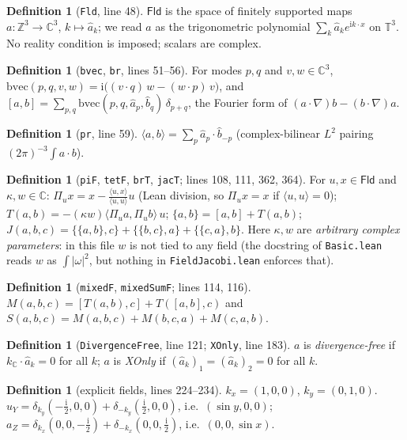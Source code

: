 \documentclass[11pt]{article}\emergencystretch=2em
\theoremstyle{definition}\newtheorem{definition}[theorem]{Definition}\theoremstyle{remark}\newtheorem{remark}[theorem]{Remark}
\newcommand{\Fld}{\mathsf{Fld}}\newcommand{\br}[2]{[#1,#2]}\newcommand{\pr}[2]{\langle #1,#2\rangle}
\newcommand{\ii}{\mathrm{i}}
\begin{document}
\begin{definition}[\texttt{Fld}, line 48]
$\Fld$ is the space of finitely supported maps $a:\mathbb Z^3\to\mathbb C^3$, $k\mapsto \hat a_k$; we read $a$ as the trigonometric polynomial $\sum_k \hat a_k e^{\ii k\cdot x}$ on $\mathbb T^3$. No reality condition is imposed; scalars are complex.
\end{definition}
\begin{definition}[\texttt{bvec}, \texttt{br}, lines 51--56]
For modes $p,q$ and $v,w\in\mathbb C^3$, $\mathrm{bvec}(p,q,v,w)=\ii\big((v\cdot q)\,w-(w\cdot p)\,v\big)$, and
$\br ab=\sum_{p,q}\mathrm{bvec}(p,q,\hat a_p,\hat b_q)\,\delta_{p+q}$, the Fourier form of $(a\cdot\nabla)b-(b\cdot\nabla)a$.
\end{definition}
\begin{definition}[\texttt{pr}, line 59]
$\pr ab=\sum_p \hat a_p\cdot \hat b_{-p}$ (complex-bilinear $L^2$ pairing $(2\pi)^{-3}\!\int a\cdot b$).
\end{definition}
\begin{definition}[\texttt{piF}, \texttt{tetF}, \texttt{brT}, \texttt{jacT}; lines 108, 111, 362, 364]
For $u,x\in\Fld$ and $\kappa,w\in\mathbb C$:
$\Pi_u x=x-\frac{\pr ux}{\pr uu}u$ (Lean division, so $\Pi_u x=x$ if $\pr uu=0$);
$T(a,b)=-(\kappa w)\pr{\Pi_u a}{\Pi_u b}\,u$;
$\{a,b\}=\br ab+T(a,b)$;
$J(a,b,c)=\{\{a,b\},c\}+\{\{b,c\},a\}+\{\{c,a\},b\}$.
Here $\kappa,w$ are \emph{arbitrary complex parameters}: in this file $w$ is not tied to any field (the docstring of \texttt{Basic.lean} reads $w$ as $\int|\omega|^2$, but nothing in \texttt{FieldJacobi.lean} enforces that).
\end{definition}
\begin{definition}[\texttt{mixedF}, \texttt{mixedSumF}; lines 114, 116]
$M(a,b,c)=\br{T(a,b)}{c}+T(\br ab,c)$ and $S(a,b,c)=M(a,b,c)+M(b,c,a)+M(c,a,b)$.
\end{definition}
\begin{definition}[\texttt{DivergenceFree}, line 121; \texttt{XOnly}, line 183]
$a$ is \emph{divergence-free} if $k_{\mathbb C}\cdot\hat a_k=0$ for all $k$; $a$ is \emph{XOnly} if $(\hat a_k)_1=(\hat a_k)_2=0$ for all $k$.
\end{definition}
\begin{definition}[explicit fields, lines 224--234]
$k_x=(1,0,0)$, $k_y=(0,1,0)$.
$u_Y=\delta_{k_y}(-\tfrac{\ii}{2},0,0)+\delta_{-k_y}(\tfrac{\ii}{2},0,0)$, i.e.\ $(\sin y,0,0)$;
$a_Z=\delta_{k_x}(0,0,-\tfrac{\ii}{2})+\delta_{-k_x}(0,0,\tfrac{\ii}{2})$, i.e.\ $(0,0,\sin x)$.
\end{definition}
\end{document}
